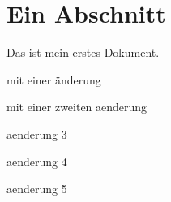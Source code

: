 \documentclass{scrartcl}
\begin{document}
\section{Ein Abschnitt}
Das ist mein erstes Dokument.

mit einer änderung

mit einer zweiten aenderung

aenderung 3

aenderung 4

aenderung 5
\end{document}
